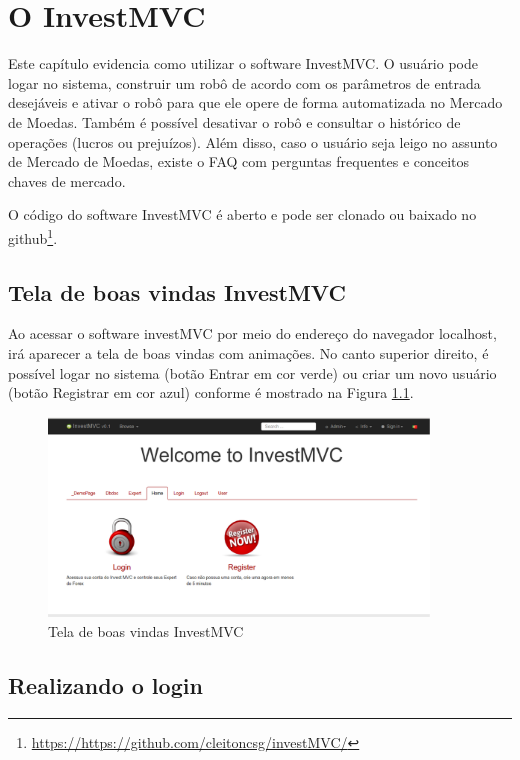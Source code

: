 \chapter{O InvestMVC}
\label{sec:invest}

Este capítulo evidencia como utilizar o software InvestMVC. O usuário pode logar no sistema, construir um robô de acordo com os parâmetros de entrada desejáveis e ativar o robô para que ele opere de forma automatizada no Mercado de Moedas. Também é possível desativar o robô e consultar o histórico de operações (lucros ou prejuízos). Além disso, caso o usuário seja leigo no assunto de Mercado de Moedas, existe o FAQ com perguntas frequentes e conceitos chaves de mercado.

O código do software InvestMVC é aberto e pode ser clonado ou baixado no github\footnote{\url{https://https://github.com/cleitoncsg/investMVC/}}.

\section{Tela de boas vindas InvestMVC}

Ao acessar o software investMVC por meio do endereço do navegador localhost, irá aparecer a tela de boas vindas com animações. No canto superior direito, é possível logar no sistema (botão Entrar em cor verde) ou criar um novo usuário (botão Registrar em cor azul) conforme é mostrado na Figura \ref{telaInicial}.

\begin{figure}[H]
\centering
\includegraphics[width=0.9\textwidth]{figuras/telaInicial}
\caption{Tela de boas vindas InvestMVC}
\label{telaInicial}
\end{figure}

\section{Realizando o login}


